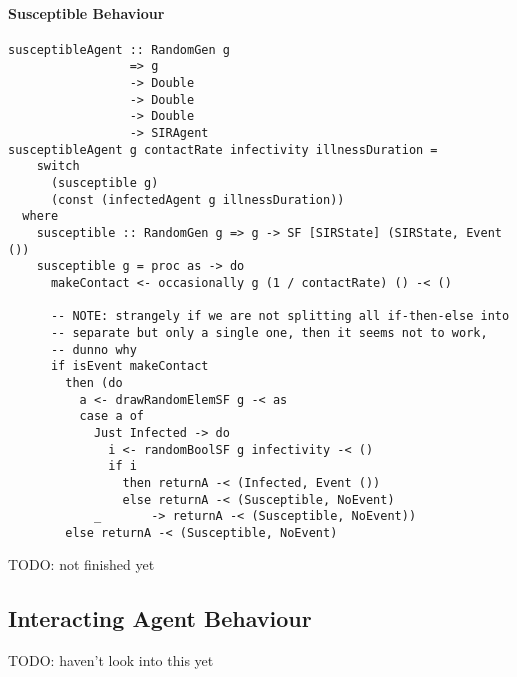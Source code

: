 \paragraph{Susceptible Behaviour}
\begin{verbatim}
susceptibleAgent :: RandomGen g 
                 => g 
                 -> Double
                 -> Double
                 -> Double 
                 -> SIRAgent
susceptibleAgent g contactRate infectivity illnessDuration = 
    switch
      (susceptible g) 
      (const (infectedAgent g illnessDuration))
  where
    susceptible :: RandomGen g => g -> SF [SIRState] (SIRState, Event ())
    susceptible g = proc as -> do
      makeContact <- occasionally g (1 / contactRate) () -< ()

      -- NOTE: strangely if we are not splitting all if-then-else into
      -- separate but only a single one, then it seems not to work,
      -- dunno why
      if isEvent makeContact
        then (do
          a <- drawRandomElemSF g -< as
          case a of
            Just Infected -> do
              i <- randomBoolSF g infectivity -< ()
              if i
                then returnA -< (Infected, Event ())
                else returnA -< (Susceptible, NoEvent)
            _       -> returnA -< (Susceptible, NoEvent))
        else returnA -< (Susceptible, NoEvent)
\end{verbatim}

TODO: not finished yet

\subsection{Interacting Agent Behaviour}
TODO: haven't look into this yet